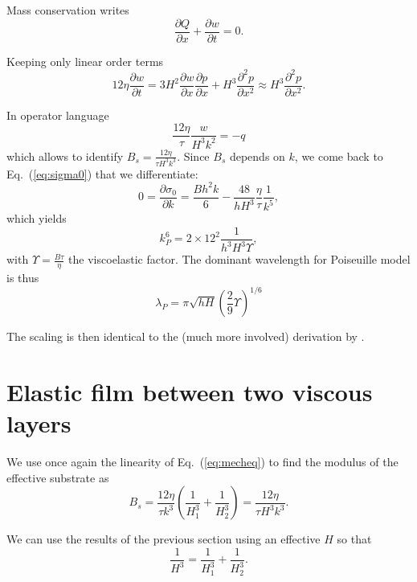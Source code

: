 \documentclass[12pt,a4paper]{revtex4}
\begin{document}
Mass conservation writes
\begin{equation}
\frac{\partial Q}{\partial x} + \frac{\partial w}{\partial t} = 0.
\label{eq:conservation}
\end{equation}

Keeping only linear order terms
\begin{equation}
12\eta\frac{\partial w}{\partial t} = 3H^2\frac{\partial w}{\partial x}\frac{\partial p}{\partial x} + H^3\frac{\partial^2 p}{\partial x^2} \approx H^3\frac{\partial^2 p}{\partial x^2}.
\label{eq:conservationLin}
\end{equation}

In operator language
\begin{equation}
\frac{12\eta}{\tau} \frac{w}{H^3k^2} = -q
\end{equation}
which allows to identify $B_s = \frac{12\eta}{\tau H^3k^3}$. Since $B_s$ depends on $k$, we come back to Eq.~(\ref{eq:sigma0}) that we differentiate:
\begin{equation}
0 = \frac{\partial\sigma_0}{\partial k}
 = \frac{Bh^2 k}{6} - \frac{48}{hH^3}\frac{\eta}{\tau}\frac{1}{k^5},
\end{equation}
which yields 
\begin{equation}
k_P^6 = 2\times 12^2 \frac{1}{h^3H^3\Upsilon},
\end{equation}
with $\Upsilon = \frac{B\tau}{\eta}$ the viscoelastic factor. The dominant wavelength for Poiseuille model is thus
\begin{equation}
\lambda_P = \pi\sqrt{hH}\left(\frac{2}{9}\Upsilon\right)^{1/6}
\end{equation}

The scaling is then identical to the (much more involved) derivation by \citet{Huang2002}.

\section{Elastic film between two viscous layers}
We use once again the linearity of Eq.~(\ref{eq:mecheq}) to find the modulus of the effective substrate as 
\begin{equation}
B_s = \frac{12\eta}{\tau k^3} \left(\frac{1}{H_1^3}+\frac{1}{H_2^3}\right) = \frac{12\eta}{\tau H^3k^3}.
\end{equation}

We can use the results of the previous section using an effective $H$ so that
\begin{equation}
\frac{1}{H^3} = \frac{1}{H_1^3}+\frac{1}{H_2^3}.
\end{equation}
\end{document}
